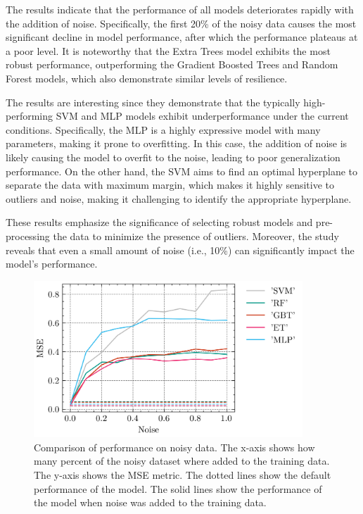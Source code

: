 The results indicate that the performance of all models deteriorates rapidly with the addition of noise.
Specifically, the first 20\% of the noisy data causes the most significant decline in model performance, after which the
performance plateaus at a poor level.
It is noteworthy that the Extra Trees model exhibits the most robust performance, outperforming the Gradient Boosted
Trees and Random Forest models, which also demonstrate similar levels of resilience.

The results are interesting since they demonstrate that the typically high-performing SVM and MLP models
exhibit underperformance under the current conditions.
Specifically, the MLP is a highly expressive model with many parameters, making it prone to overfitting.
In this case, the addition of noise is likely causing the model to overfit to the noise, leading to poor
generalization performance.
On the other hand, the SVM aims to find an optimal hyperplane to separate the data with maximum margin, which makes
it highly sensitive to outliers and noise, making it challenging to identify the appropriate hyperplane.

These results emphasize the significance of selecting robust models and pre-processing the data to minimize the
presence of outliers.
Moreover, the study reveals that even a small amount of noise (i.e., 10\%) can significantly impact the model's
performance.

\begin{figure}[h]
    \begin{tcolorbox}[arc=0pt,boxrule=0.5pt]
        \centering
        \includegraphics[width=0.9\textwidth]{chap5/images/results_noise}
    \end{tcolorbox}
    \caption{Comparison of performance on noisy data.
    The x-axis shows how many percent of the noisy dataset where added to the training data.
    The y-axis shows the MSE metric.
    The dotted lines show the default performance of the model.
    The solid lines show the performance of the model when noise was added to the training data.
    }
    \label{fig:results-noise-fig}
\end{figure}



